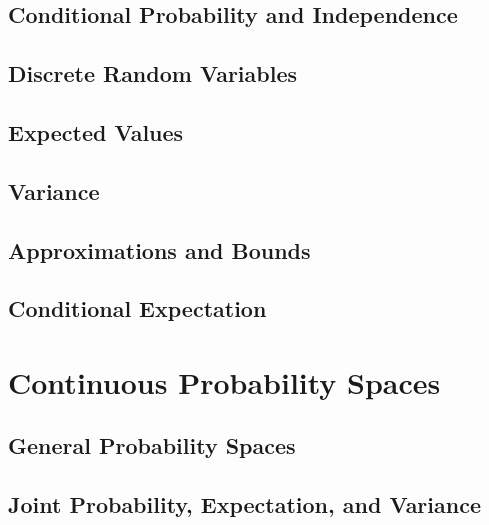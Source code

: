 \documentclass[10pt]{article}
\begin{document}
\newpage
\subsection{Conditional Probability and Independence}


\newpage
\subsection{Discrete Random Variables}


\newpage
\subsection{Expected Values}


\newpage
\subsection{Variance}


\newpage
\subsection{Approximations and Bounds}


\newpage
\subsection{Conditional Expectation}


\newpage
\section{Continuous Probability Spaces}
\subsection{General Probability Spaces}


\newpage
\subsection{Joint Probability, Expectation, and Variance}

\end{document}
